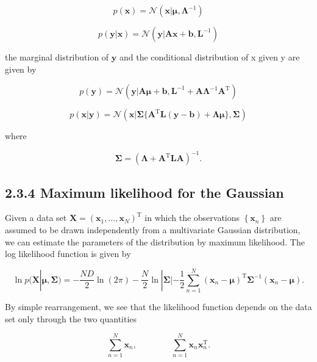 \documentclass[
  10
]{article}
\begin{document}
\[
{p (\mathbf {x})} = {\mathcal {N} (\mathbf {x} | \pmb {\mu}, \pmb {\Lambda} ^ {- 1})}\tag{2.113}
\]

\[
p (\mathbf {y} | \mathbf {x}) = \mathcal {N} (\mathbf {y} | \mathbf {A x} + \mathbf {b}, \mathbf {L} ^ {- 1})\tag{2.114}
\]

the marginal distribution of \(\mathbf { y }\) and the conditional
distribution of x given y are given by

\[
p (\mathbf {y}) = \mathcal {N} (\mathbf {y} | \mathbf {A} \boldsymbol {\mu} + \mathbf {b}, \mathbf {L} ^ {- 1} + \mathbf {A} \boldsymbol {\Lambda} ^ {- 1} \mathbf {A} ^ {\mathrm{T}})\tag{2.115}
\]

\[
{p (\mathbf {x} | \mathbf {y})} = {\mathcal {N} (\mathbf {x} | \boldsymbol {\Sigma} \{\mathbf {A} ^ {\mathrm{T}} \mathbf {L} (\mathbf {y} - \mathbf {b}) + \boldsymbol {\Lambda} \boldsymbol {\mu} \}, \boldsymbol {\Sigma})}\tag{2.116}
\]

where

\[
\boldsymbol {\Sigma} = \left(\boldsymbol {\Lambda} + \mathbf {A} ^ {\mathrm{T}} \mathbf {L} \mathbf {A}\right) ^ {- 1}.\tag{2.117}
\]

\subsection{2.3.4 Maximum likelihood for the
Gaussian}\label{maximum-likelihood-for-the-gaussian}

Given a data set
\(\mathbf { X } = ( \mathbf { x } _ { 1 } , \ldots , \mathbf { x } _ { N } ) ^ { \mathrm { T } }\)
in which the observations \(\left\{ \mathbf { x } _ { n } \right\}\) are
assumed to be drawn independently from a multivariate Gaussian
distribution, we can estimate the parameters of the distribution by
maximum likelihood. The log likelihood function is given by

\[
\ln p (\mathbf {X} | \boldsymbol {\mu}, \boldsymbol {\Sigma}) = - \frac {N D}{2} \ln (2 \pi) - \frac {N}{2} \ln | \boldsymbol {\Sigma} | - \frac {1}{2} \sum_ {n = 1} ^ {N} \left(\mathbf {x} _ {n} - \boldsymbol {\mu}\right) ^ {\mathrm{T}} \boldsymbol {\Sigma} ^ {- 1} \left(\mathbf {x} _ {n} - \boldsymbol {\mu}\right).\tag{2.118}
\]

By simple rearrangement, we see that the likelihood function depends on
the data set only through the two quantities

\[
\sum_ {n = 1} ^ {N} \mathbf {x} _ {n}, \qquad \qquad \sum_ {n = 1} ^ {N} \mathbf {x} _ {n} \mathbf {x} _ {n} ^ {\mathrm{T}}.\tag{2.119}
\]
\end{document}
